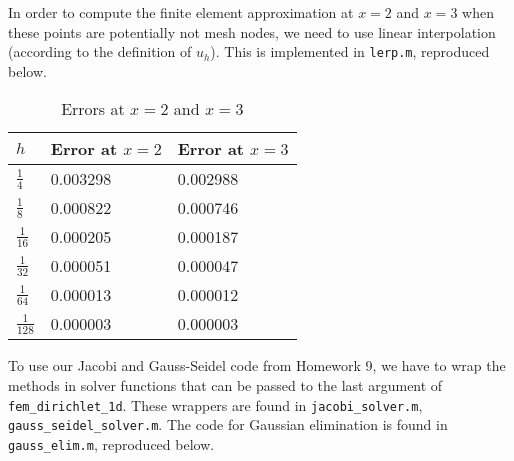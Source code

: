 \documentclass{homework}
\begin{document}
\begin{alphaparts}
		In order to compute the finite element approximation at $x=2$ and $x=3$ when these points are potentially not mesh nodes, we need to use linear interpolation (according to the definition of $u_h$). This is implemented in \verb*|lerp.m|, reproduced below.
		
		\begin{table}[h]
			\centering
			\begin{tabular}{@{}lll@{}}
				\toprule
				$h$ & Error at $x=2$ & Error at $x=3$ \\
				\midrule
				$\frac{1}{4}$ & 0.003298 & 0.002988 \\[.4em]
				$\frac{1}{8}$ & 0.000822 & 0.000746 \\[.4em]
				$\frac{1}{16}$ & 0.000205 & 0.000187 \\[.4em]
				$\frac{1}{32}$ & 0.000051 & 0.000047 \\[.4em]
				$\frac{1}{64}$ & 0.000013 & 0.000012 \\[.4em]
				$\frac{1}{128}$ & 0.000003 & 0.000003 \\[.4em]
				\bottomrule
			\end{tabular}
			\caption{Errors at $x=2$ and $x=3$}
			\label{table:errors23}
		\end{table}
	\end{alphaparts}
	
	\question
	To use our Jacobi and Gauss-Seidel code from Homework 9, we have to wrap the methods in solver functions that can be passed to the last argument of \verb*|fem_dirichlet_1d|. These wrappers are found in \verb*|jacobi_solver.m|, \verb*|gauss_seidel_solver.m|. The code for Gaussian elimination is found in \verb*|gauss_elim.m|, reproduced below.
	
	\begin{minipage}{\linewidth}
		
	\end{minipage}
	
\end{document}
